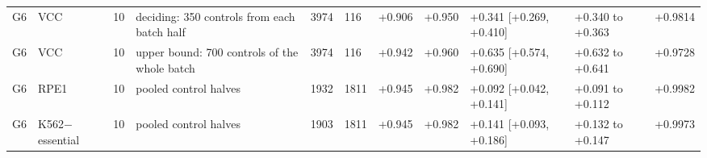 \begin{tabular}{lllllllllll}
G6 & VCC & 10 & deciding: 350 controls from each batch half & 3974 & 116 & +0.906 & +0.950 & +0.341 [+0.269, +0.410] & +0.340 to +0.363 & +0.9814 \\
G6 & VCC & 10 & upper bound: 700 controls of the whole batch & 3974 & 116 & +0.942 & +0.960 & +0.635 [+0.574, +0.690] & +0.632 to +0.641 & +0.9728 \\
G6 & RPE1 & 10 & pooled control halves & 1932 & 1811 & +0.945 & +0.982 & +0.092 [+0.042, +0.141] & +0.091 to +0.112 & +0.9982 \\
G6 & K562$-$essential & 10 & pooled control halves & 1903 & 1811 & +0.945 & +0.982 & +0.141 [+0.093, +0.186] & +0.132 to +0.147 & +0.9973 \\
\bottomrule
\end{tabular}
